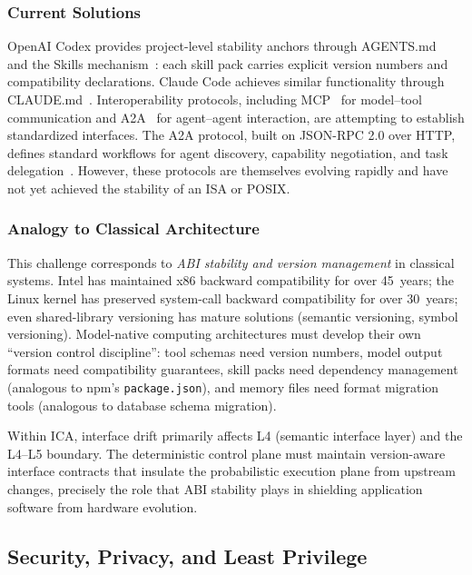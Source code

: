\subsubsection{Current Solutions}
OpenAI Codex provides project-level stability anchors through AGENTS.md~\cite{openai_codex_agents_md_2026} and the Skills mechanism~\cite{openai_codex_skills_2026}: each skill pack carries explicit version numbers and compatibility declarations.
Claude Code achieves similar functionality through CLAUDE.md~\cite{anthropic_claudecode_memory_2026}.
Interoperability protocols, including MCP~\cite{mcp_intro_2026} for model--tool communication and A2A~\cite{google_a2a_2025} for agent--agent interaction, are attempting to establish standardized interfaces.
The A2A protocol, built on JSON-RPC 2.0 over HTTP, defines standard workflows for agent discovery, capability negotiation, and task delegation~\cite{google_a2a_2025}.
However, these protocols are themselves evolving rapidly and have not yet achieved the stability of an ISA or POSIX.

\subsubsection{Analogy to Classical Architecture}
This challenge corresponds to \emph{ABI stability and version management} in classical systems.
Intel has maintained x86 backward compatibility for over 45~years; the Linux kernel has preserved system-call backward compatibility for over 30~years; even shared-library versioning has mature solutions (semantic versioning, symbol versioning).
Model-native computing architectures must develop their own ``version control discipline'': tool schemas need version numbers, model output formats need compatibility guarantees, skill packs need dependency management (analogous to npm's \texttt{package.json}), and memory files need format migration tools (analogous to database schema migration).

Within ICA, interface drift primarily affects L4 (semantic interface layer) and the L4--L5 boundary.
The deterministic control plane must maintain version-aware interface contracts that insulate the probabilistic execution plane from upstream changes, precisely the role that ABI stability plays in shielding application software from hardware evolution.

\subsection{Security, Privacy, and Least Privilege}

